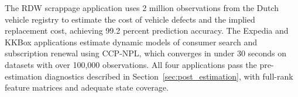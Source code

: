 The RDW scrappage application uses 2 million observations from the Dutch vehicle registry to estimate the cost of vehicle defects and the implied replacement cost, achieving 99.2 percent prediction accuracy.
The Expedia and KKBox applications estimate dynamic models of consumer search and subscription renewal using CCP-NPL, which converges in under 30 seconds on datasets with over 100{,}000 observations.
All four applications pass the pre-estimation diagnostics described in Section~\ref{sec:post_estimation}, with full-rank feature matrices and adequate state coverage.
